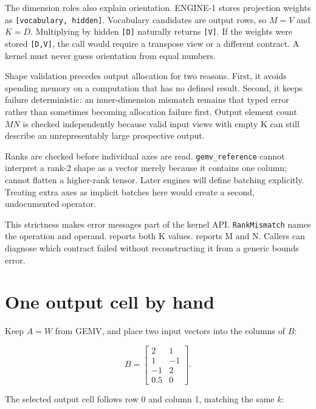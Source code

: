 The dimension roles also explain orientation. ENGINE-1 stores projection
weights as \texttt{{[}vocabulary,\ hidden{]}}. Vocabulary candidates are
output rows, so \(M=V\) and \(K=D\). Multiplying by hidden
\texttt{{[}D{]}} naturally returns \texttt{{[}V{]}}. If the weights were
stored \texttt{{[}D,V{]}}, the call would require a transpose view or a
different contract. A kernel must never guess orientation from equal
numbers.

Shape validation precedes output allocation for two reasons. First, it
avoids spending memory on a computation that has no defined result.
Second, it keeps failure deterministic: an inner-dimension mismatch
remains that typed error rather than sometimes becoming allocation
failure first. Output element count \(MN\) is checked independently
because valid input views with empty K can still describe an
unrepresentably large prospective output.

Ranks are checked before individual axes are read.
\texttt{gemv\_reference} cannot interpret a rank-2 shape as a vector
merely because it contains one column;
\texttt{} cannot flatten a higher-rank
tensor. Later engines will define batching explicitly. Treating extra
axes as implicit batches here would create a second, undocumented
operator.

This strictness makes error messages part of the kernel API.
\texttt{RankMismatch} names the operation and operand.
\texttt{} reports both K values.
\texttt{} reports M and N. Callers can
diagnose which contract failed without reconstructing it from a generic
bounds error.

\section{One output cell by hand}\label{one-output-cell-by-hand}

Keep \(A=W\) from GEMV, and place two input vectors into the columns of
\(B\):

\begin{equation}
B=
\begin{bmatrix}
2&1\\
1&-1\\
-1&2\\
0.5&0
\end{bmatrix}.
\end{equation}

The selected output cell follows row 0 and column 1, matching the same
\(k\):

